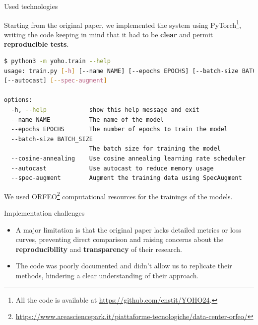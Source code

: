 	\begin{frame}[fragile]{Used technologies}
	
		Starting from the original paper, we implemented the system using PyTorch\footnote{All the code is available at \url{https://github.com/enstit/YOHO24}.},
		writing the code keeping in mind that it had to be \textbf{clear} and permit \textbf{reproducible tests}.
		
		\begin{lstlisting}[basicstyle=\tiny\ttfamily\color{white},language=bash,backgroundcolor=\color{black},caption={Training script parameters}, label={trainingParams},captionpos=b]
$ python3 -m yoho.train --help
usage: train.py [-h] [--name NAME] [--epochs EPOCHS] [--batch-size BATCH_SIZE] [--cosine-annealing]
[--autocast] [--spec-augment]

options:
  -h, --help            show this help message and exit
  --name NAME           The name of the model
  --epochs EPOCHS       The number of epochs to train the model
  --batch-size BATCH_SIZE
                        The batch size for training the model
  --cosine-annealing    Use cosine annealing learning rate scheduler
  --autocast            Use autocast to reduce memory usage
  --spec-augment        Augment the training data using SpecAugment
		\end{lstlisting}

		We used ORFEO\footnote{\url{https://www.areasciencepark.it/piattaforme-tecnologiche/data-center-orfeo/}} computational resources for the trainings of the models.
		
	\end{frame}
	
	\begin{frame}{Implementation challenges}
	\begin{itemize}
		\item A major limitation is that the original paper lacks detailed metrics or loss curves, preventing direct comparison and raising concerns about the \textbf{reproducibility} and \textbf{transparency} of their research.
		
		\item The code was poorly documented and didn’t allow us to replicate their methods, hindering a clear understanding of their approach.
		
		\end{itemize} 
	
	\end{frame}
	
